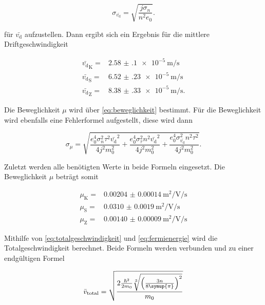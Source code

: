 \begin{equation}
    \sigma _{\bar{v_\text{d}}} = \sqrt{\frac{j \sigma _n}{n^2 e_0}}.
    \label{eq:vd_fehler}
\end{equation}

für $\bar{v_\text{d}}$ aufzustellen.
Dann ergibt sich ein Ergebnis für die mittlere Driftgeschwindigkeit 

\begin{align*}
    \bar{v_\text{d}}_\text{K} =& \SI{2.58(10)e-5}{\meter\per\second} \\
    \bar{v_\text{d}}_\text{S} =& \SI{6.52(23)e-5}{\meter\per\second} \\
    \bar{v_\text{d}}_\text{Z} =& \SI{8.38(33)e-5}{\meter\per\second}.
\end{align*}

Die Beweglichkeit $\mu$ wird über \autoref{eq:beweglichkeit} bestimmt.
Für die Beweglichkeit wird ebenfalls eine Fehlerformel aufgestellt, diese wird dann

\begin{equation}
    \sigma _{\mu} = \sqrt{\frac{e_{0}^{4} \sigma_{n}^{2} \tau^{2} {\bar{v_\text{d}}}^{2}}{4 j^{2} m_{0}^{2}} + \frac{e_{0}^{4} \sigma_{\tau}^{2} n^{2} {\bar{v_\text{d}}}^{2}}{4 j^{2} m_{0}^{2}} + \frac{e_{0}^{4} \sigma_{\bar{v_\text{d}}}^{2} n^{2} \tau^{2}}{4 j^{2} m_{0}^{2}}}.
    \label{eq:bewegl_fehler}
\end{equation}

Zuletzt werden alle benötigten Werte in beide Formeln eingesetzt.
Die Beweglichkeit $\mu$ beträgt somit

\begin{align*}
    \mu _\text{K} =& \SI{0.00204(14)}{\meter\squared\per\volt\per\second}\\
    \mu _\text{S} =& \SI{0.0310(19)}{\meter\squared\per\volt\per\second}\\
    \mu _\text{Z} =& \SI{0.00140(9)}{\meter\squared\per\volt\per\second}
\end{align*}

Mithilfe von \autoref{eq:totalgeschwindigkeit} und \autoref{eq:fermienergie} wird die Totalgeschwindigkeit berechnet.
Beide Formeln werden verbunden und zu einer endgültigen Formel

\begin{equation}
    \bar{v}_\text{total} = \sqrt{\frac{2 \frac{\hbar^2}{2 m_0}\sqrt[3]{\left(\frac{3n}{8\symup{\pi}}\right)^2}}{m_0}}
    \label{eq:totalgeschw.}
\end{equation}

